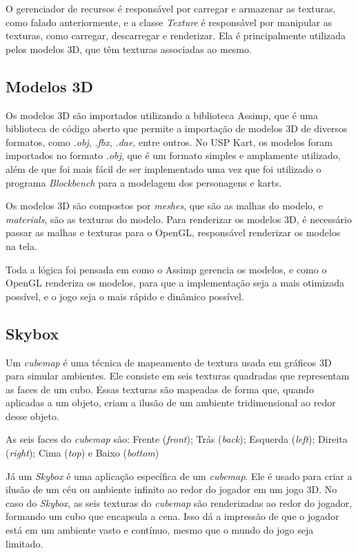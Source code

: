 O gerenciador de recursos é responsável por carregar e armazenar as texturas, como falado anteriormente, e a classe \textit{Texture} é responsável por manipular as texturas, como carregar, descarregar e renderizar. Ela é principalmente utilizada pelos modelos 3D, que têm texturas associadas ao mesmo.


\subsection{Modelos 3D}

Os modelos 3D são importados utilizando a biblioteca Assimp, que é uma biblioteca de código aberto que permite a importação de modelos 3D de diversos formatos, como \textit{.obj}, \textit{.fbx}, \textit{.dae}, entre outros. No USP Kart, os modelos foram importados no formato \textit{.obj}, que é um formato simples e amplamente utilizado, além de que foi mais fácil de ser implementado uma vez que foi utilizado o programa \textit{Blockbench} para a modelagem dos personagens e karts.

Os modelos 3D são compostos por \textit{meshes}, que são as malhas do modelo, e \textit{materials}, são as texturas do modelo. Para renderizar os modelos 3D, é necessário passar as malhas e texturas para o OpenGL, responsável renderizar os modelos na tela.

Toda a lógica foi pensada em como o Assimp gerencia os modelos, e como o OpenGL renderiza os modelos, para que a implementação seja a mais otimizada possível, e o jogo seja o mais rápido e dinâmico possível.

\subsection{Skybox}

Um \textit{cubemap} é uma técnica de mapeamento de textura usada em gráficos 3D para simular ambientes. Ele consiste em seis texturas quadradas que representam as faces de um cubo. Essas texturas são mapeadas de forma que, quando aplicadas a um objeto, criam a ilusão de um ambiente tridimensional ao redor desse objeto.

As seis faces do \textit{cubemap} são: Frente (\textit{front}); Trás (\textit{back}); Esquerda (\textit{left}); Direita (\textit{right}); Cima (\textit{top}) e Baixo (\textit{bottom})

Já um \textit{Skybox} é uma aplicação específica de um \textit{cubemap}. Ele é usado para criar a ilusão de um céu ou ambiente infinito ao redor do jogador em um jogo 3D. No caso do \textit{Skybox}, as seis texturas do \textit{cubemap} são renderizadas ao redor do jogador, formando um cubo que encapsula a cena. Isso dá a impressão de que o jogador está em um ambiente vasto e contínuo, mesmo que o mundo do jogo seja limitado.

